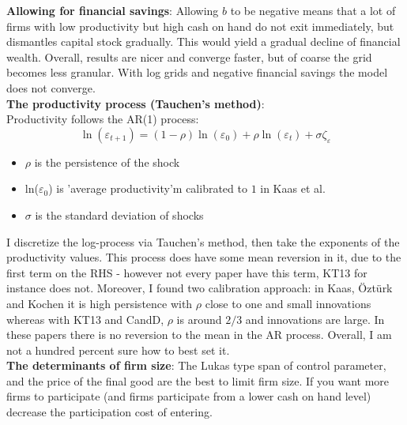 \documentclass[12pt]{article}
\begin{document}
\textbf{Allowing for financial savings}:  Allowing $b$ to be negative means that a lot of firms with low productivity but high cash on hand do not exit immediately, but dismantles capital stock gradually. This would yield a gradual decline of financial wealth. Overall, results are nicer and converge faster, but of coarse the grid becomes less granular. With log grids and negative financial savings the model does not converge.  \vspace{3mm} \\
\textbf{The productivity process (Tauchen's method)}: \\
Productivity follows the AR(1) process:
$$ \ln(\varepsilon_{t+1}) = (1-\rho) \ln(\varepsilon_0) + \rho \ln(\varepsilon_t) + \sigma \zeta_\varepsilon $$
\begin{itemize}\setlength\itemsep{0em} \small
    \item $\rho$ is the persistence of the shock
    \item ln($\varepsilon_0$) is 'average productivity'm calibrated to $1$ in Kaas et al.
    \item $\sigma$ is the standard deviation of shocks
\end{itemize} \normalsize
I discretize the log-process via Tauchen's method, then take the exponents of the productivity values. This process does have some mean reversion in it, due to the first term on the RHS - however not every paper have this term, KT13 for instance does not. Moreover, I found two calibration approach: in Kaas, Öztürk and Kochen it is high persistence with $\rho$ close to one and small innovations whereas with KT13 and CandD, $\rho$ is around $2/3$ and innovations are large. In these papers there is no reversion to the mean in the AR process. Overall, I am not a hundred percent sure how to best set it.  \vspace{3mm} \\
\textbf{The determinants of firm size}: The Lukas type span of control parameter, and the price of the final good are the best to limit firm size. If you want more firms to participate (and firms participate from a lower cash on hand level) decrease the participation cost of entering.
\end{document}
